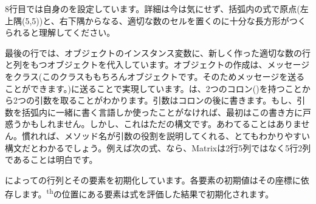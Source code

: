 \documentclass[a4paper,10pt,twoside]{book}
\begin{document}
8行目では自身のを設定しています。詳細は今は気にせず、括弧内の式で原点(\ie 左上隅(5,5))と、右下隅からなる、適切な数のセルを置くのに十分な長方形がつくられると理解してください。

最後の行では、オブジェクトのインスタンス変数に、新しく作った適切な数の行と列をもつオブジェクトを代入しています。オブジェクトの作成は、メッセージをクラス(このクラスももちろんオブジェクトです。そのためメッセージを送ることができます。)に送ることで実現しています。は、2つのコロン(\ct{:})を持つことから2つの引数を取ることがわかります。引数はコロンの後に書きます。もし、引数を括弧内に一緒に書く言語しか使ったことがなければ、最初はこの書き方に戸惑うかもしれません。しかし、これはただの構文です。あわてることはありません。慣れれば、メソッド名が引数の役割を説明してくれる、とてもわかりやすい構文だとわかるでしょう。例えば次の式、なら、Matrixは2行5列ではなく5行2列であることは明白です。


によっての行列とその要素を初期化しています。各要素の初期値はその座標に依存します。\textsuperscript{th}の位置にある要素は式を評価した結果で初期化されます。




\end{document}
